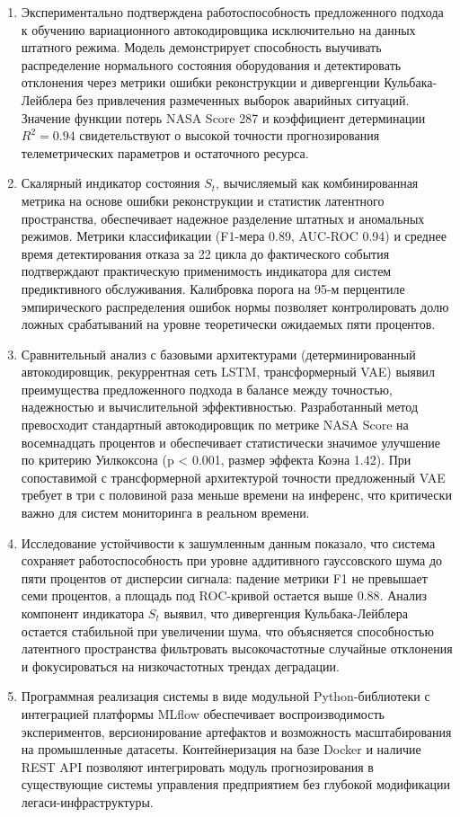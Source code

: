\documentclass[14pt, a4paper, oneside]{extreport}
\begin{document}
\begin{enumerate}
\item Экспериментально подтверждена работоспособность предложенного подхода к обучению вариационного автокодировщика исключительно на данных штатного режима. Модель демонстрирует способность выучивать распределение нормального состояния оборудования и детектировать отклонения через метрики ошибки реконструкции и дивергенции Кульбака-Лейблера без привлечения размеченных выборок аварийных ситуаций. Значение функции потерь NASA Score 287 и коэффициент детерминации $R^2 = 0.94$ свидетельствуют о высокой точности прогнозирования телеметрических параметров и остаточного ресурса.

\item Скалярный индикатор состояния $S_t$, вычисляемый как комбинированная метрика на основе ошибки реконструкции и статистик латентного пространства, обеспечивает надежное разделение штатных и аномальных режимов. Метрики классификации (F1-мера 0.89, AUC-ROC 0.94) и среднее время детектирования отказа за 22 цикла до фактического события подтверждают практическую применимость индикатора для систем предиктивного обслуживания. Калибровка порога на 95-м перцентиле эмпирического распределения ошибок нормы позволяет контролировать долю ложных срабатываний на уровне теоретически ожидаемых пяти процентов.

\item Сравнительный анализ с базовыми архитектурами (детерминированный автокодировщик, рекуррентная сеть LSTM, трансформерный VAE) выявил преимущества предложенного подхода в балансе между точностью, надежностью и вычислительной эффективностью. Разработанный метод превосходит стандартный автокодировщик по метрике NASA Score на восемнадцать процентов и обеспечивает статистически значимое улучшение по критерию Уилкоксона (p < 0.001, размер эффекта Коэна 1.42). При сопоставимой с трансформерной архитектурой точности предложенный VAE требует в три с половиной раза меньше времени на инференс, что критически важно для систем мониторинга в реальном времени.

\item Исследование устойчивости к зашумленным данным показало, что система сохраняет работоспособность при уровне аддитивного гауссовского шума до пяти процентов от дисперсии сигнала: падение метрики F1 не превышает семи процентов, а площадь под ROC-кривой остается выше 0.88. Анализ компонент индикатора $S_t$ выявил, что дивергенция Кульбака-Лейблера остается стабильной при увеличении шума, что объясняется способностью латентного пространства фильтровать высокочастотные случайные отклонения и фокусироваться на низкочастотных трендах деградации.

\item Программная реализация системы в виде модульной Python-библиотеки с интеграцией платформы MLflow обеспечивает воспроизводимость экспериментов, версионирование артефактов и возможность масштабирования на промышленные датасеты. Контейнеризация на базе Docker и наличие REST API позволяют интегрировать модуль прогнозирования в существующие системы управления предприятием без глубокой модификации легаси-инфраструктуры.
\end{enumerate}
\end{document}
